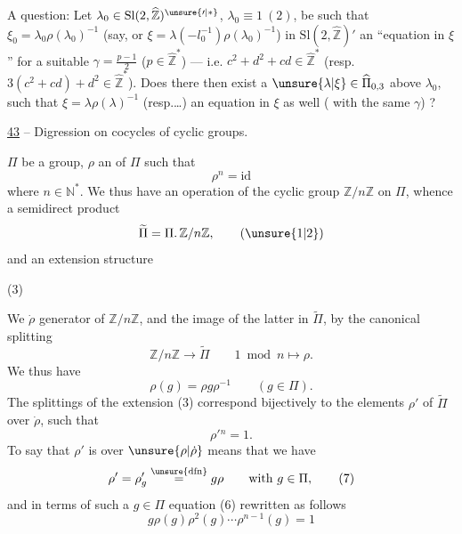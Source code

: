 A question: Let $\lambda_0\in\mathrm{Sl}(2,\widehat{\mathbb Z})^{\unsure{\prime|*}}$, $\lambda_0\equiv1\ (2)$, be such that $\xi_0=\lambda_0\rho(\lambda_0)^{-1}$ (say, or $\xi=\lambda(-l_0^{-1})\rho(\lambda_0)^{-1}$)   in $\mathrm{Sl}(2,\widehat{\mathbb Z})'$ an ``equation in $\xi$'' for a suitable $\gamma=\frac{p-1}{2}$ ($p\in\widehat{\mathbb Z}^{*}$) --- i.e. $c^2+d^2+cd\in\widehat{\mathbb Z}^{*}$ (resp. $3(c^2+cd)+d^2\in\widehat{\mathbb Z}^{*}$). Does there then exist a $\unsure{\lambda|\xi}\in\widehat{\Pi}_{0,3}$ above $\lambda_0$, such that $\xi=\lambda\rho(\lambda)^{-1}$ (resp.\ldots)  an equation in $\xi$ as well ( with the same $\gamma$) ?


\uline{43}  -- Digression on cocycles of cyclic groups.

 $\Pi$ be a group, $\rho$ an  of $\Pi$ such that
\[
\rho^n=\mathrm{id} \tag{1}
\]
where $n\in\mathbb N^*$. We thus have an operation of the cyclic group $\mathbb Z/n\mathbb Z$ on $\Pi$, whence a semidirect product
\[
\widetilde\Pi=\Pi.\,\mathbb Z/n\mathbb Z, \tag{\unsure{1|2}}
\]
and an extension structure

(3) 

We  $\dot\rho$  generator of $\mathbb Z/n\mathbb Z$, and   the image of the latter in $\widetilde\Pi$, by the canonical splitting 
\[
\mathbb Z/n\mathbb Z\longrightarrow\widetilde\Pi\qquad 1\bmod n\longmapsto\rho. \tag{4}
\]
We thus have
\[
\rho(g)=\rho g\rho^{-1}\qquad(g\in\Pi). \tag{5}
\]
The splittings of the extension (3) correspond bijectively to the elements $\rho'$ of $\widetilde\Pi$ over $\dot\rho$, such that
\[
\rho'{}^n=1. \tag{6}
\]
To say that $\rho'$ is over $\unsure{\rho|\dot\rho}$ means that we have
\[
\rho'=\rho'_g\overset{\unsure{\mathrm{dfn}}}{=}g\rho\qquad\text{with }g\in\Pi, \tag{7}
\]
and in terms of such a $g\in\Pi$ equation (6)  rewritten as follows
\[
\boxed{g\rho(g)\rho^2(g)\cdots\rho^{n-1}(g)=1} \tag{8}
\]

